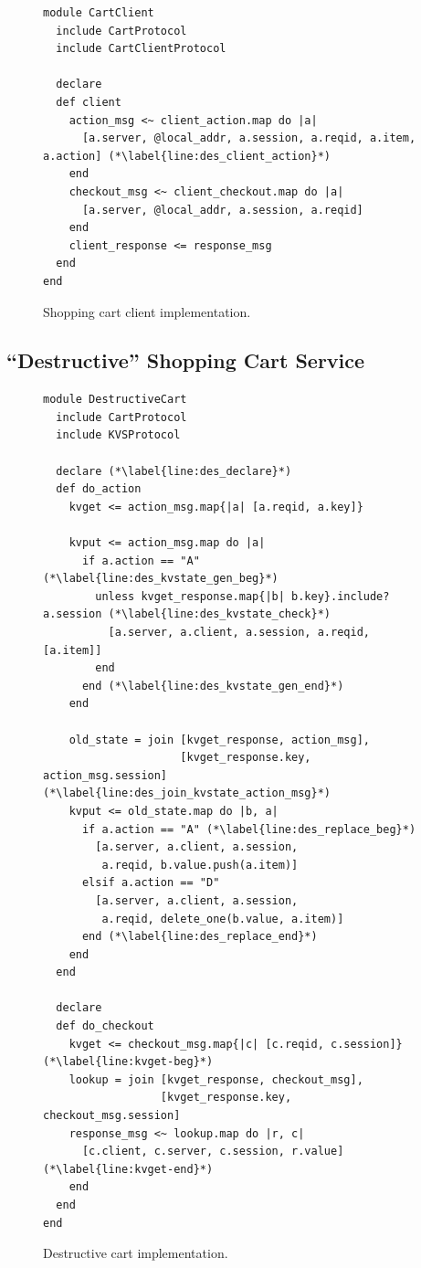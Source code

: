 \begin{figure}[t]
\begin{scriptsize}
\begin{lstlisting}
module CartClient
  include CartProtocol
  include CartClientProtocol

  declare
  def client
    action_msg <~ client_action.map do |a| 
      [a.server, @local_addr, a.session, a.reqid, a.item, a.action] (*\label{line:des_client_action}*)
    end
    checkout_msg <~ client_checkout.map do |a| 
      [a.server, @local_addr, a.session, a.reqid]
    end
    client_response <= response_msg
  end
end
\end{lstlisting}
\vspace{-10pt}
\caption{Shopping cart client implementation.}
\label{fig:cart-client}
\end{scriptsize}
\vspace{-2pt}
\end{figure}

\subsection{``Destructive'' Shopping Cart Service}

\begin{figure}[t]
\begin{scriptsize}
\begin{lstlisting}
module DestructiveCart
  include CartProtocol
  include KVSProtocol

  declare (*\label{line:des_declare}*)
  def do_action
    kvget <= action_msg.map{|a| [a.reqid, a.key]}

    kvput <= action_msg.map do |a|
      if a.action == "A" (*\label{line:des_kvstate_gen_beg}*)
        unless kvget_response.map{|b| b.key}.include? a.session (*\label{line:des_kvstate_check}*)
          [a.server, a.client, a.session, a.reqid, [a.item]]
        end
      end (*\label{line:des_kvstate_gen_end}*)
    end

    old_state = join [kvget_response, action_msg],
                     [kvget_response.key, action_msg.session]  (*\label{line:des_join_kvstate_action_msg}*)
    kvput <= old_state.map do |b, a|
      if a.action == "A" (*\label{line:des_replace_beg}*)
        [a.server, a.client, a.session, 
         a.reqid, b.value.push(a.item)]
      elsif a.action == "D"
        [a.server, a.client, a.session, 
         a.reqid, delete_one(b.value, a.item)]
      end (*\label{line:des_replace_end}*)
    end
  end

  declare
  def do_checkout
    kvget <= checkout_msg.map{|c| [c.reqid, c.session]} (*\label{line:kvget-beg}*)
    lookup = join [kvget_response, checkout_msg],
                  [kvget_response.key, checkout_msg.session]
    response_msg <~ lookup.map do |r, c|
      [c.client, c.server, c.session, r.value] (*\label{line:kvget-end}*)
    end
  end
end
\end{lstlisting}
\vspace{-10pt}
\caption{Destructive cart implementation.}
\label{fig:dest-cart}
\end{scriptsize}
\vspace{-2pt}
\end{figure}

